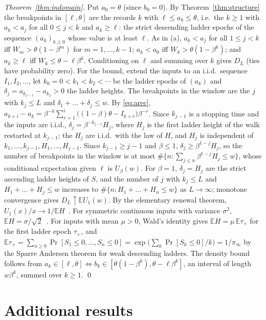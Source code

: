 \documentclass[10pt]{article}
\theoremstyle{remark}
\begin{document}
\emph{Theorem~\ref{thm:indomain}.} Put $a_0=\theta$ (since $b_0=0$). By Theorem~\ref{thm:structure} the breakpoints in $[\ell,\theta]$ are the records $k$ with $\ell\le a_k\le\theta$, i.e.\ the $k\ge1$ with $a_k<a_j$ for all $0\le j<k$ and $a_k\ge\ell$: the strict descending ladder epochs of the sequence $(a_k)_{k\ge0}$ whose value is at least $\ell$. As in (a), $a_k<a_j$ for all $1\le j<k$ iff $W_m>\theta(1-\beta^m)$ for $m=1,\dots,k-1$; $a_k<a_0$ iff $W_k>\theta(1-\beta^k)$; and $a_k\ge\ell$ iff $W_k\le\theta-\ell\beta^k$. Conditioning on $\ell$ and summing over $k$ gives $D_L$ (ties have probability zero). For the bound, extend the inputs to an i.i.d.\ sequence $I_1,I_2,\dots$, let $k_0=0<k_1<k_2<\cdots$ be the ladder epochs of $(a_k)$ and $\delta_j=a_{k_{j-1}}-a_{k_j}>0$ the ladder heights. The breakpoints in the window are the $j$ with $k_j\le L$ and $\delta_1+\dots+\delta_j\le w$. By \eqref{eq:arec}, $a_{k+i}-a_k=\beta^{-k}\sum_{r=1}^i\big((1-\beta)\theta-I_{k+r}\big)\beta^{-r}$. Since $k_{j-1}$ is a stopping time and the inputs are i.i.d., $\delta_j=\beta^{-k_{j-1}}H_j$, where $H_j$ is the first ladder height of the walk restarted at $k_{j-1}$; the $H_j$ are i.i.d.\ with the law of $H$, and $H_j$ is independent of $k_1,\dots,k_{j-1},H_1,\dots,H_{j-1}$. Since $k_{j-1}\ge j-1$ and $\beta\le1$, $\delta_j\ge\beta^{1-j}H_j$, so the number of breakpoints in the window is at most $\#\{n:\sum_{j\le n}\beta^{1-j}H_j\le w\}$, whose conditional expectation given $\ell$ is $U_\beta(w)$. For $\beta=1$, $\delta_j=H_j$ are the strict ascending ladder heights of $S$, and the number of $j$ with $k_j\le L$ and $H_1+\dots+H_j\le w$ increases to $\#\{n:H_1+\dots+H_n\le w\}$ as $L\to\infty$; monotone convergence gives $D_L\uparrow\mathbb EU_1(w)$. By the elementary renewal theorem, $U_1(x)/x\to1/\mathbb EH$~\citep{feller1971}. For symmetric continuous inputs with variance $\sigma^2$, $\mathbb EH=\sigma/\sqrt2$~\citep{feller1971}. For inputs with mean $\mu>0$, Wald's identity gives $\mathbb EH=\mu\,\mathbb E\tau_+$ for the first ladder epoch $\tau_+$, and $\mathbb E\tau_+=\sum_{n\ge0}\Pr[S_1\le0,\dots,S_n\le0]=\exp\big(\sum_k\Pr[S_k\le0]/k\big)=1/\pi_\infty$ by the Sparre Andersen theorem for weak descending ladders. The density bound follows from $a_k\in[\ell,\theta]\iff b_k\in[\theta(1-\beta^k),\theta-\ell\beta^k]$, an interval of length $w\beta^k$, summed over $k\ge1$. \qed

\section{Additional results}
\label{app:extra}
\end{document}
